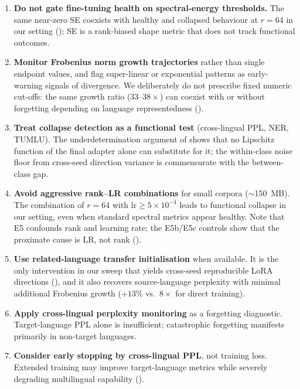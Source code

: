 \documentclass[11pt]{article}
\begin{document}
\begin{enumerate}
    \item \textbf{Do not gate fine-tuning health on spectral-energy thresholds.} The same near-zero SE coexists with healthy and collapsed behaviour at $r{=}64$ in our setting (); SE is a rank-biased shape metric that does not track functional outcomes.
    \item \textbf{Monitor Frobenius norm growth trajectories} rather than single endpoint values, and flag super-linear or exponential patterns as early-warning signals of divergence. We deliberately do not prescribe fixed numeric cut-offs: the same growth ratio ($33$--$38\times$) can coexist with or without forgetting depending on language representedness ().
    \item \textbf{Treat collapse detection as a functional test} (cross-lingual PPL, NER, TUMLU). The underdetermination argument of  shows that no Lipschitz function of the final adapter alone can substitute for it; the within-class noise floor from cross-seed direction variance is commensurate with the between-class gap.
    \item \textbf{Avoid aggressive rank--LR combinations} for small corpora ($\sim$150~MB). The combination of $r{=}64$ with $\text{lr} \geq 5 \times 10^{-4}$ leads to functional collapse in our setting, even when standard spectral metrics appear healthy. Note that E5 confounds rank and learning rate; the E5b/E5c controls show that the proximate cause is LR, not rank ().
    \item \textbf{Use related-language transfer initialisation} when available. It is the only intervention in our sweep that yields cross-seed reproducible LoRA directions (), and it also recovers source-language perplexity with minimal additional Frobenius growth ($+13\%$ vs.\ $8\times$ for direct training).
    \item \textbf{Apply cross-lingual perplexity monitoring} as a forgetting diagnostic. Target-language PPL alone is insufficient; catastrophic forgetting manifests primarily in non-target languages.
    \item \textbf{Consider early stopping by cross-lingual PPL}, not training loss. Extended training may improve target-language metrics while severely degrading multilingual capability ().
\end{enumerate}

\end{document}
